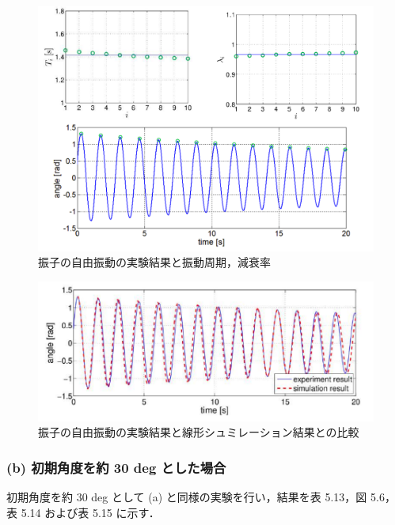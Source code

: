 \begin{figure}[h]
  \centering
  \includegraphics[scale=0.7]{sozai/6.pdf}
  \caption{振子の自由振動の実験結果と振動周期，減衰率}
\end{figure}

\begin{figure}[h]
  \centering
  \includegraphics[scale=0.7]{sozai/7.pdf}
  \caption{振子の自由振動の実験結果と線形シュミレーション結果との比較}
\end{figure}

\subsubsection*{(b) 初期角度を約 30 deg とした場合}

初期角度を約 30 deg として (a) と同様の実験を行い，結果を表 5.13，図 5.6，表 5.14 および表 5.15 
に示す．

